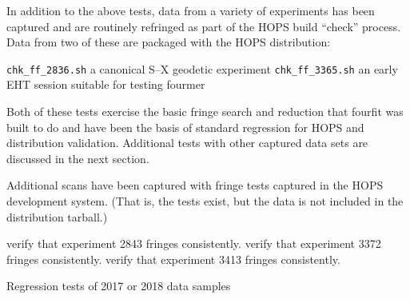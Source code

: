 In addition to the above tests, data from a variety of experiments
has been captured and are routinely refringed as part of the
\ac{HOPS} build ``check'' process.  Data from two of
these are packaged with the \ac{HOPS} distribution:

\begin{description}
 \texttt{chk\_ff\_2836.sh} a canonical S--X geodetic experiment
 \texttt{chk\_ff\_3365.sh} an early \ac{EHT} session suitable for
    testing \ac{fourmer}
\end{description}
Both of these tests exercise the basic fringe search and reduction
that \acs{fourfit} was built to do and have been the basis of standard
regression for \ac{HOPS} and distribution validation.   Additional tests
with other captured data sets are discussed in the next section.







Additional scans have been captured with fringe tests captured
in the \ac{HOPS} development system.  (That is, the tests exist,
but the data is not included in the distribution tarball.)

\begin{description}
 verify that experiment 2843 fringes consistently.
 verify that experiment 3372 fringes consistently.
 verify that experiment 3413 fringes consistently.

 Regression tests of 2017 or 2018 data samples

\end{description}

